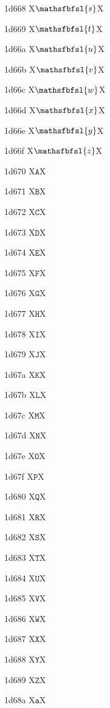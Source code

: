 \documentclass[11pt]{article}
\begin{document}
1d668 X{\ensuremath{\mathsfbfsl{s}}}X

1d669 X{\ensuremath{\mathsfbfsl{t}}}X

1d66a X{\ensuremath{\mathsfbfsl{u}}}X

1d66b X{\ensuremath{\mathsfbfsl{v}}}X

1d66c X{\ensuremath{\mathsfbfsl{w}}}X

1d66d X{\ensuremath{\mathsfbfsl{x}}}X

1d66e X{\ensuremath{\mathsfbfsl{y}}}X

1d66f X{\ensuremath{\mathsfbfsl{z}}}X

1d670 X{\ensuremath{\mathtt{A}}}X

1d671 X{\ensuremath{\mathtt{B}}}X

1d672 X{\ensuremath{\mathtt{C}}}X

1d673 X{\ensuremath{\mathtt{D}}}X

1d674 X{\ensuremath{\mathtt{E}}}X

1d675 X{\ensuremath{\mathtt{F}}}X

1d676 X{\ensuremath{\mathtt{G}}}X

1d677 X{\ensuremath{\mathtt{H}}}X

1d678 X{\ensuremath{\mathtt{I}}}X

1d679 X{\ensuremath{\mathtt{J}}}X

1d67a X{\ensuremath{\mathtt{K}}}X

1d67b X{\ensuremath{\mathtt{L}}}X

1d67c X{\ensuremath{\mathtt{M}}}X

1d67d X{\ensuremath{\mathtt{N}}}X

1d67e X{\ensuremath{\mathtt{O}}}X

1d67f X{\ensuremath{\mathtt{P}}}X

1d680 X{\ensuremath{\mathtt{Q}}}X

1d681 X{\ensuremath{\mathtt{R}}}X

1d682 X{\ensuremath{\mathtt{S}}}X

1d683 X{\ensuremath{\mathtt{T}}}X

1d684 X{\ensuremath{\mathtt{U}}}X

1d685 X{\ensuremath{\mathtt{V}}}X

1d686 X{\ensuremath{\mathtt{W}}}X

1d687 X{\ensuremath{\mathtt{X}}}X

1d688 X{\ensuremath{\mathtt{Y}}}X

1d689 X{\ensuremath{\mathtt{Z}}}X

1d68a X{\ensuremath{\mathtt{a}}}X
\end{document}
